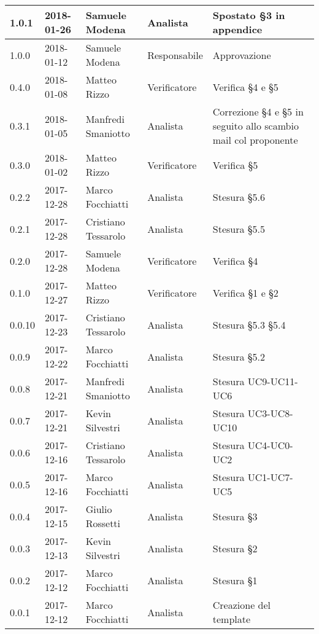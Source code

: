 \documentclass[./AnalisideiRequisiti.tex]{subfiles}
\begin{document}
{\begin{longtable}{|p{20mm}|p{20mm}|p{40mm}|p{30mm}|p{50mm}|}
		1.0.1 & 2018-01-26 & Samuele Modena & Analista & Spostato §3 in appendice\\ \hline
		1.0.0 & 2018-01-12 & Samuele Modena & Responsabile & Approvazione\\ \hline
		0.4.0 & 2018-01-08 & Matteo Rizzo & Verificatore & Verifica §4 e §5\\ \hline
		0.3.1 & 2018-01-05 & Manfredi Smaniotto & Analista & Correzione §4 e §5 in seguito allo scambio mail col proponente \\ \hline		
		0.3.0 & 2018-01-02 & Matteo Rizzo & Verificatore & Verifica §5\\ \hline
		0.2.2 & 2017-12-28 & Marco Focchiatti & Analista & Stesura §5.6\\ \hline	
		0.2.1 & 2017-12-28 & Cristiano Tessarolo & Analista & Stesura §5.5\\ \hline
	   	0.2.0 & 2017-12-28 & Samuele Modena & Verificatore & Verifica §4\\ \hline
	   	0.1.0 & 2017-12-27 & Matteo Rizzo & Verificatore & Verifica §1 e §2  \\ \hline		
		0.0.10 & 2017-12-23 & Cristiano Tessarolo & Analista & Stesura §5.3 §5.4\\ \hline		
		0.0.9 & 2017-12-22 & Marco Focchiatti & Analista & Stesura §5.2 \\ \hline		
		0.0.8 & 2017-12-21 & Manfredi Smaniotto & Analista & Stesura UC9-UC11-UC6\\ \hline
		0.0.7 & 2017-12-21 & Kevin Silvestri & Analista & Stesura UC3-UC8-UC10\\ \hline
		0.0.6 & 2017-12-16 & Cristiano Tessarolo & Analista & Stesura UC4-UC0-UC2\\ \hline
		0.0.5 & 2017-12-16 & Marco Focchiatti & Analista & Stesura UC1-UC7-UC5\\ \hline
		0.0.4 & 2017-12-15 & Giulio Rossetti & Analista & Stesura §3\\ \hline
		0.0.3 & 2017-12-13 & Kevin Silvestri & Analista & Stesura §2\\ \hline
		0.0.2 & 2017-12-12 & Marco Focchiatti & Analista & Stesura §1\\ \hline
		0.0.1 & 2017-12-12 & Marco Focchiatti & Analista & Creazione del template\\ \hline
	\end{longtable}

}	
\end{document}
